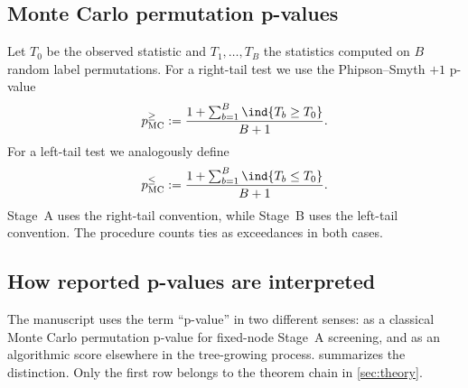 \subsection{Monte Carlo permutation p-values}
\label{sec:plusone}

Let $T_0$ be the observed statistic and $T_1,\dots,T_B$ the statistics
computed on $B$ random label permutations. For a right-tail test we use the
Phipson--Smyth $+1$ p-value
\citep{NorthCurtisSham2002EmpiricalPValuesMonteCarlo,PhipsonSmyth2010PermutationPValues}
%
\begin{equation}
  p_{\mathrm{MC}}^{\ge} := \frac{1 + \sum_{b=1}^B \ind\{T_b \ge T_0\}}{B+1}.
\end{equation}
%
For a left-tail test we analogously define
%
\begin{equation}
  p_{\mathrm{MC}}^{\le} := \frac{1 + \sum_{b=1}^B \ind\{T_b \le T_0\}}{B+1}.
\end{equation}
%
Stage~A uses the right-tail convention, while Stage~B uses the left-tail
convention. The procedure counts ties as exceedances in both cases.

\subsection{How reported p-values are interpreted}
\label{sec:pvalue-scope}

The manuscript uses the term ``p-value'' in two different senses: as a
classical Monte Carlo permutation p-value for fixed-node Stage~A screening, and
as an algorithmic score elsewhere in the tree-growing process.
 summarizes the distinction. Only the first row belongs
to the theorem chain in \cref{sec:theory}.

